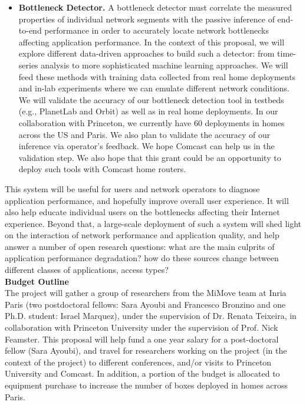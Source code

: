 \documentclass[11 pt]{article}
\begin{document}
\begin{itemize}
\item \textbf{Bottleneck Detector.} A bottleneck detector must correlate the measured properties of individual network segments with the passive inference of end-to-end performance in order to accurately locate network bottlenecks affecting application performance. In the context of this proposal, we will explore different data-driven approaches to build such a detector: from time-series analysis to more sophisticated machine learning approaches. We will feed these methods with training data collected from real home deployments and in-lab experiments where we can emulate different network conditions. We will validate the accuracy of our bottleneck detection tool in testbeds (e.g., PlanetLab and Orbit) as well as in real home deployments. In our collaboration with Princeton, we currently have 60 deployments in homes across the US and Paris. We also plan to validate the accuracy of our inference via operator's feedback. We hope Comcast can help us in the validation step. We also hope that this grant could be an opportunity to deploy such tools with Comcast home routers.
\end{itemize}

This system will be useful for users and network operators to diagnose application performance, and hopefully improve overall user experience. It will also help educate individual users on the bottlenecks affecting their Internet experience. Beyond that, a large-scale deployment of such a system will shed light on the interaction of network performance and application quality, and help answer a number of open research questions: what are the main culprits of application performance degradation? how do these sources change between different classes of applications, access types?\\

\noindent \textbf{Budget Outline}\\

The project will gather a group of researchers from the MiMove team at Inria Paris (two postdoctoral fellows: Sara Ayoubi and Francesco Bronzino and one Ph.D. student: Israel Marquez), under the supervision of Dr. Renata Teixeira, in collaboration with Princeton University under the supervision of Prof. Nick Feamster. This proposal will help fund a one year salary for a post-doctoral fellow (Sara Ayoubi), and travel for researchers working on the project (in the context of the project) to different conferences, and/or visits to Princeton University and Comcast. In addition, a portion of the budget is allocated to equipment purchase to increase the number of boxes deployed in homes across Paris.\\
\end{document}
